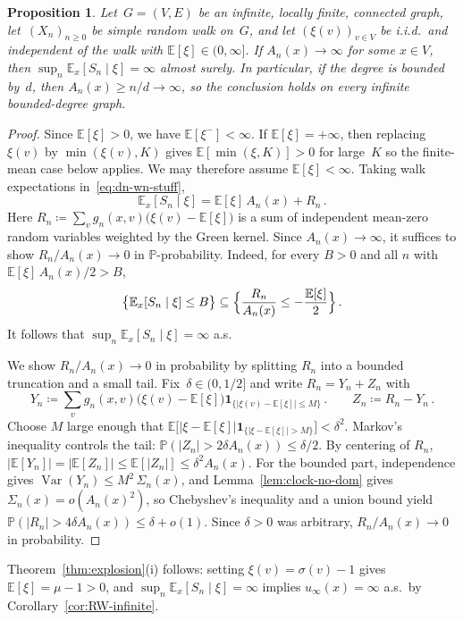 \documentclass[aop]{imsart}
\theoremstyle{plain}
\newtheorem{proposition}[theorem]{Proposition}
\theoremstyle{definition}
\newcommand{\E}{\mathbb{E}}
\renewcommand{\P}{\mathbb{P}}
\newcommand{\one}{\mathbf{1}}
\DeclareMathOperator{\var}{Var}
\begin{document}
	\begin{proposition}\label{prop:supercritical}
		Let~$G = (V,E)$ be an infinite, locally finite, connected graph, let~$(X_n)_{n\geq 0}$ be simple random walk on~$G$, and let $(\xi(v))_{v\in V}$ be i.i.d.\ and independent of the walk with
		$\E[\xi] \in (0, \infty]$. If $A_n(x)\to\infty$ for some $x\in V$, then $\sup_n\E_x[S_n\mid\xi]=\infty$ almost surely.
		In particular, if the degree is bounded by~$d$, then $A_n(x)\geq n/d\to\infty$, so the conclusion holds on every infinite bounded-degree graph.
	\end{proposition}
	\begin{proof}
		Since $\E[\xi]>0$, we have $\E[\xi^-]<\infty$. If $\E[\xi]=+\infty$, then replacing $\xi(v)$ by $\min(\xi(v),K)$ gives $\E[\min(\xi,K)]>0$ for large~$K$ so the finite-mean case below applies. We may therefore assume $\E[\xi]<\infty$. Taking walk expectations in~\eqref{eq:dn-wn-stuff},
		\[
		\E_x[S_n \mid \xi] = \E[\xi]\,A_n(x) + R_n\,.
		\]
		Here $R_n \coloneqq \sum_{v} g_n(x,v)\bigl(\xi(v)-\E[\xi]\bigr)$ is a sum of independent mean-zero random variables weighted by the Green kernel. Since $A_n(x)\to\infty$, it suffices to show $R_n/A_n(x) \to 0$ in $\P$-probability. Indeed, for every $B > 0$ and all $n$ with $\E[\xi]\, A_n(x)/2>B$,
		\[
		\bigl\{\E_x[S_n\mid\xi] \leq B\bigr\} \subseteq \Bigl\{\frac{R_n}{A_n(x)} \leq -\frac{\E[\xi]}{2}\Bigr\}\,.
		\]
		It follows that $\sup_n \E_x[S_n\mid\xi] = \infty$ a.s.
		
		We show $R_n/A_n(x)\to 0$ in probability by splitting $R_n$ into a bounded truncation and a small tail. Fix~$\delta \in (0,1/2]$ and write $R_n = Y_n + Z_n$ with
		\[Y_n \coloneqq \sum_{v} g_n(x,v)\bigl(\xi(v)-\E[\xi]\bigr)\one_{\{|\xi(v)-\E[\xi]|\leq M\}}\,.
		\qquad
		Z_n \coloneqq R_n - Y_n\,.
		\]
		Choose $M$ large enough that $\E\bigl[|\xi - \E[\xi]| \one_{\{|\xi-\E[\xi]|>M\}}\bigr] < \delta^2$.
		Markov's inequality controls the tail: $\P(|Z_n| > 2\delta A_n(x)) \leq \delta/2$. By centering of $R_n$, $|\E[Y_n]|=|\E[Z_n]|\leq\E[|Z_n|]\leq\delta^2 A_n(x)$. For the bounded part, independence gives $\var(Y_n)\leq M^2\,\Sigma_n(x)$, and Lemma~\ref{lem:clock-no-dom} gives $\Sigma_n(x)=o(A_n(x)^2)$, so Chebyshev's inequality and a union bound yield $\P(|R_n| > 4\delta A_n(x)) \leq \delta+o(1)$. Since $\delta > 0$ was arbitrary, $R_n/A_n(x) \to 0$ in probability.
	\end{proof}
	
	Theorem~\ref{thm:explosion}(i) follows: setting $\xi(v)=\sigma(v)-1$ gives $\E[\xi]=\mu-1>0$, and $\sup_n\E_x[S_n\mid\xi]=\infty$ implies $u_\infty(x)=\infty$ a.s.\ by Corollary~\ref{cor:RW-infinite}.
	
\end{document}
